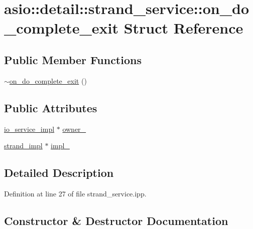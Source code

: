 \hypertarget{structasio_1_1detail_1_1strand__service_1_1on__do__complete__exit}{}\section{asio\+:\+:detail\+:\+:strand\+\_\+service\+:\+:on\+\_\+do\+\_\+complete\+\_\+exit Struct Reference}
\label{structasio_1_1detail_1_1strand__service_1_1on__do__complete__exit}
\subsection*{Public Member Functions}
\begin{DoxyCompactItemize}
\item 
\hyperlink{structasio_1_1detail_1_1strand__service_1_1on__do__complete__exit_aed22e3e37d23770c1c50e726b9bd1688}{$\sim$on\+\_\+do\+\_\+complete\+\_\+exit} ()
\end{DoxyCompactItemize}
\subsection*{Public Attributes}
\begin{DoxyCompactItemize}
\item 
\hyperlink{namespaceasio_1_1detail_a6d61d9b8e53c11288be549d82aec5a42}{io\+\_\+service\+\_\+impl} $\ast$ \hyperlink{structasio_1_1detail_1_1strand__service_1_1on__do__complete__exit_ac89a70e6bafface28bb66fa68ea18e0f}{owner\+\_\+}
\item 
\hyperlink{classasio_1_1detail_1_1strand__service_1_1strand__impl}{strand\+\_\+impl} $\ast$ \hyperlink{structasio_1_1detail_1_1strand__service_1_1on__do__complete__exit_ad7c122c327dc69d0faf6b074d6cbd2b1}{impl\+\_\+}
\end{DoxyCompactItemize}


\subsection{Detailed Description}


Definition at line 27 of file strand\+\_\+service.\+ipp.



\subsection{Constructor \& Destructor Documentation}
\hypertarget{structasio_1_1detail_1_1strand__service_1_1on__do__complete__exit_aed22e3e37d23770c1c50e726b9bd1688}{}
